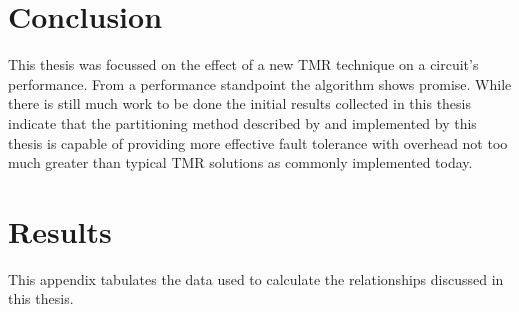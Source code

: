 \documentclass[12pt,final,oneside]{dwThesis} %
\begin{document}
   \chapter{Conclusion}
   This thesis was focussed on the effect of a new \ac{TMR} technique on a circuit's performance. From a performance standpoint the algorithm shows promise. While there is still much work to be done the initial results collected in this thesis indicate that the partitioning method described by  and implemented by this thesis is capable of providing more effective fault tolerance with overhead not too much greater than typical \ac{TMR} solutions as commonly implemented today.


   \appendix
   \chapter{Results}
   This appendix tabulates the data used to calculate the relationships discussed in this thesis.
   
\end{document}
